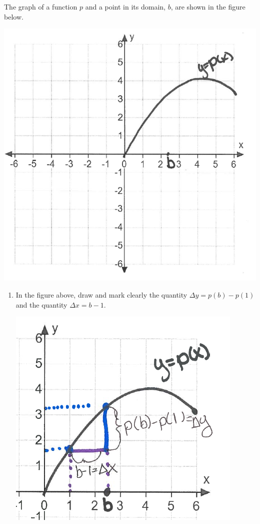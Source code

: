 \documentclass[nooutcomes,handout]{ximera}
\begin{document}
\begin{problem}

The graph of a function $p$ and a point in its domain, $b$, are shown in the figure below.
	        \begin{image}
          \includegraphics[scale = 0.5]{Figure6.png}
        \end{image}

	\begin{enumerate}
		\item In the figure above, draw and mark clearly the quantity $\Delta y=p(b)-p(1)$ and the quantity $\Delta x=b-1$.
		\begin{freeResponse}\hfil
	        \begin{image}
          \includegraphics[scale = 0.7]{Figure7.png}
        \end{image}


\end{freeResponse}
\end{enumerate}
\end{problem}
\end{document}
